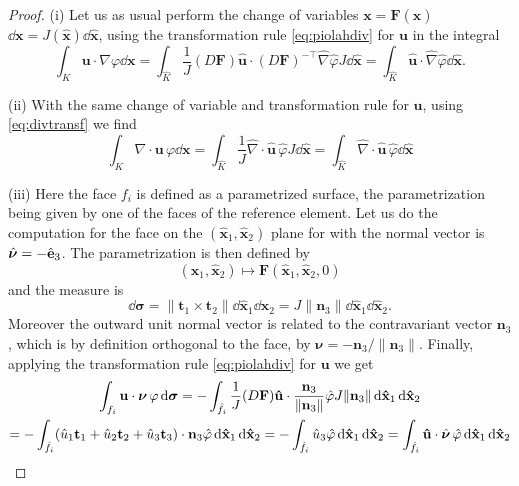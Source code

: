 \begin{proof}
(i) Let us as usual perform the change of variables $ \mathbf{x} = \mathbf{F}( \mathbf{\hat{x}})$ $ \dd \mathbf{x} = J( \hat{\mathbf{x}}) \dd \hat{\mathbf{x}}$, using the transformation rule  \eqref{eq:piolahdiv} for $ \mathbf{u}$
 in the integral
$$\int_K  \mathbf{u}\cdot \nabla\varphi \dd \mathbf{x} = \int_{\hat{K}} \frac{1}{J} (D \mathbf{F} )\hat{\mathbf{u}}\cdot (D \mathbf{F})^{-\top} \hat{\nabla} \hat{\varphi} J \dd \mathbf{\hat{x}}
=  \int_{\hat{K}} 
\hat{\mathbf{u}}\cdot \hat{\nabla} \hat{\varphi}  \dd \mathbf{\hat{x}}.$$

(ii) With the same change of variable and transformation rule for $ \mathbf{u}$, using  \eqref{eq:divtransf} we find
$$\int_K \nabla\cdot \mathbf{u} \,\varphi \dd \mathbf{x} 
= \int_{\hat{K}} \frac{1}{J} \hat{\nabla}\cdot\hat{\mathbf{u}} \,\hat{\varphi} J \dd \hat{\mathbf{x}}
= \int_{\hat{K}}  \hat{\nabla}\cdot\hat{\mathbf{u}}
\,\hat{\varphi} \dd \hat{\mathbf{x}}
$$

(iii) Here the face $f_i$ is defined as a parametrized surface, the parametrization being given by
one of the faces of the reference element. Let us do the computation for the face on the $ ( \mathbf{\hat{x}}_1,  \mathbf{\hat{x}}_2)$ plane for with the normal vector is $ \hat{\boldsymbol{\nu}}= - \hat{\mathbf{e}}_3$. The parametrization is then defined by 
$$( \mathbf{\hat{x}}_1,  \mathbf{\hat{x}}_2) \mapsto \mathbf{F}( \mathbf{\hat{x}}_1,  \mathbf{\hat{x}}_2,0)$$
and the measure is 
$$ \dd \boldsymbol{\sigma} = \|\mathbf{t}_1\times \mathbf{t}_2\| \dd \mathbf{\hat{x}}_1
 \dd \mathbf{\hat{x}}_2 = J\|\mathbf{n}_3\|\dd \mathbf{\hat{x}}_1
 \dd \mathbf{\hat{x}}_2.$$
 Moreover the outward unit normal vector is related to the contravariant vector $ \mathbf{n}_3$, which is by definition orthogonal to the face, by $ \mathbf{\nu}= -\mathbf{n}_3/\| \mathbf{n}_3\|$.
Finally, applying the transformation rule \eqref{eq:piolahdiv} for $ \mathbf{u}$  we get 
\begin{multline*}
\int_{f_i} \mathbf{u}\cdot \boldsymbol{\nu} \,\varphi \,{\rm d} \boldsymbol{\sigma} =
-\int_{ \hat{f}_i} \frac{1}{J} (D \mathbf{F})\mathbf{\hat{u}}\cdot \frac{ \mathbf{n}_3}{\| \mathbf{n}_3\| }\hat{\varphi}  J\|\mathbf{n}_3\|\,{\rm d} \mathbf{\hat{x}}_1
 \,{\rm d} \mathbf{\hat{x}}_2
 \\=- \int_{ \hat{f}_i} (\hat{u}_1 \mathbf{t}_1 + \hat{u}_2 \mathbf{t}_2 +\hat{u}_3 \mathbf{t}_3)\cdot \mathbf{n}_3 \hat{\varphi} \,{\rm d} \mathbf{\hat{x}}_1 \,{\rm d} \mathbf{\hat{x}}_2 
 =-\int_{ \hat{f}_i} \hat{u}_3 \hat{\varphi} \,{\rm d} \mathbf{\hat{x}}_1 \,{\rm d} \mathbf{\hat{x}}_2
=\int_{ \hat{f}_i} \mathbf{\hat{u}}\cdot \hat{\boldsymbol{\nu}} \, \hat{\varphi} 
 \,{\rm d} \mathbf{\hat{x}}_1 \,{\rm d} \mathbf{\hat{x}}_2
\end{multline*}
\end{proof}

